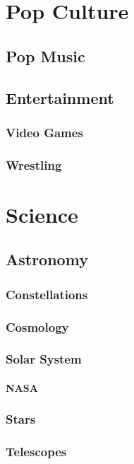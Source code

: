 \documentclass[12pt]{book}
\begin{document}
	

	

		
	
\chapter{Pop Culture}
	\section{Pop Music}
	\section{Entertainment}
		\subsection{Video Games}
		\subsection{Wrestling}



\chapter{Science}
	\section{Astronomy}
		\subsection{Constellations}
		\subsection{Cosmology}
		\subsection{Solar System}
		\subsubsection{NASA}
		\subsection{Stars}
		\subsection{Telescopes}
\end{document}
